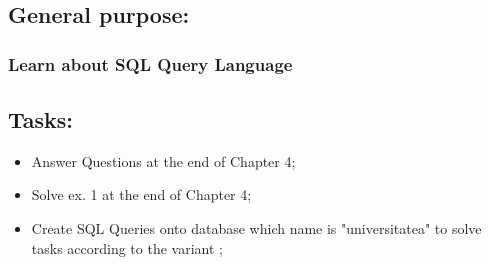 \documentclass[12pt]{article}
\begin{document}
        \pagebreak
        \subsection*{ General purpose:}
        \subsubsection*{ Learn about SQL Query Language}
        
        \subsection*{Tasks:}
        \begin{itemize}
                \item Answer Questions at the end of Chapter 4;
                \item Solve ex. 1 at the end of Chapter 4;
                \item Create SQL Queries onto database which name is "universitatea" to solve tasks according to the variant  ;
                
        \end{itemize}
\end{document}
